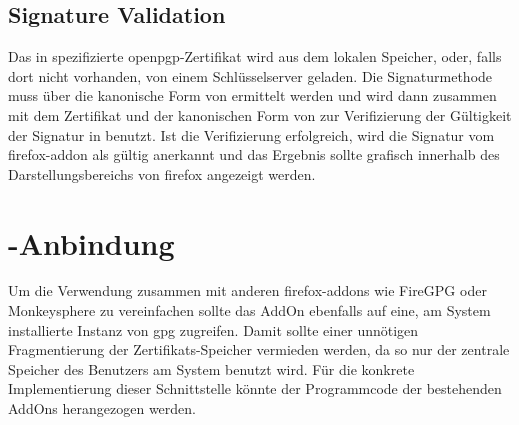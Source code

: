\subsection{Signature Validation}
Das in  spezifizierte \gls{openpgp}-Zertifikat wird aus dem lokalen Speicher, oder, falls dort nicht vorhanden, von einem Schlüsselserver
geladen. Die Signaturmethode muss über die kanonische Form von  ermittelt werden und wird dann zusammen mit dem Zertifikat und der
kanonischen Form von  zur Verifizierung der Gültigkeit der Signatur in  benutzt. Ist die Verifizierung erfolgreich,
wird die Signatur vom \gls{firefox-addon} als gültig anerkannt und das Ergebnis sollte grafisch innerhalb des Darstellungsbereichs von \gls{firefox} angezeigt
werden.

\section{\protect{}-Anbindung}
\label{sec:Anforderungen:GnuPG-Anbindung}
Um die Verwendung zusammen mit anderen \glspl{firefox-addon} wie FireGPG oder Monkeysphere zu vereinfachen sollte das AddOn ebenfalls auf eine, am System
installierte Instanz von \gls{gpg} zugreifen. Damit sollte einer unnötigen Fragmentierung der Zertifikats-Speicher vermieden werden, da so nur der zentrale
Speicher des Benutzers am System benutzt wird. Für die konkrete Implementierung dieser Schnittstelle könnte der Programmcode der bestehenden AddOns herangezogen
werden.


